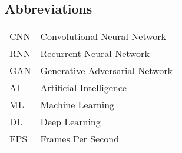 \begin{center}
    \section*{Abbreviations}
    \begin{table}[h]
        \centering
        \begin{tabular}{ll}
            CNN & \hspace{2.3 in} Convolutional Neural Network   \\
            RNN & \hspace{2.3 in} Recurrent Neural Network       \\
            GAN & \hspace{2.3 in} Generative Adversarial Network \\
            AI  & \hspace{2.3 in} Artificial Intelligence        \\
            ML  & \hspace{2.3 in} Machine Learning               \\
            DL  & \hspace{2.3 in} Deep Learning                  \\
            FPS & \hspace{2.3 in} Frames Per Second              \\
        \end{tabular}
    \end{table}
\end{center}

